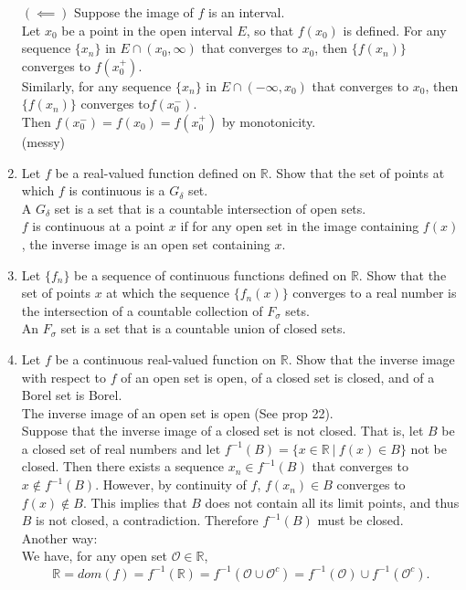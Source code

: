 \begin{enumerate}
	$(\impliedby)$ Suppose the image of $f$ is an interval.\\
	Let $x_0$ be a point in the open interval $E$, so that $f(x_0)$ is defined. 
	For any sequence $\{x_n\}$ in $E\cap(x_0,\infty)$ that converges to $x_0$, then $\{f(x_n)\}$ converges to $f(x_0^+)$.\\
	Similarly, for any sequence $\{x_n\}$ in $E\cap(-\infty,x_0)$ that converges to $x_0$, then $\{f(x_n)\}$ converges to$f(x_0^-)$.\\
	Then $f(x_0^-)=f(x_0)= f(x_0^+)$ by monotonicity.
	\\(messy)
	\item Let $f$ be a real-valued function defined on $\mathbb{R}$. Show that the set of points at which $f$ is continuous is a $G_\delta$ set.\\
	A $G_\delta$ set is a set that is a countable intersection of open sets.\\
	$f$ is continuous at a point $x$ if for any open set in the image containing $f(x)$, the inverse image is an open set containing $x$.
	\item Let $\{ f_n\}$ be a sequence of continuous functions defined on $\mathbb{R}$. Show that the set of points $x$ at which the sequence $\{f_n(x)\}$ converges to a real number is the intersection of a countable collection of $F_\sigma$ sets.\\
	An $F_\sigma$ set is a set that is a countable union of closed sets.
	\item Let $f$ be a continuous real-valued function on $\mathbb{R}$. Show that the inverse image with respect to $f$ of an open set is open, of a closed set is closed, and of a Borel set is Borel.\\
	The inverse image of an open set is open (See prop 22).\\
	Suppose that the inverse image of a closed set is not closed.
	That is, let $B$ be a closed set of real numbers and let $f^{-1}(B)=\{x\in\mathbb{R}\ |\ f(x)\in B\}$ not be closed. 
	Then there exists a sequence $x_n\in f^{-1}(B)$ that converges to $x \notin f^{-1}(B)$.
	However, by continuity of $f$, $f(x_n)\in B$ converges to $f(x)\notin B$.
	This implies that $B$ does not contain all its limit points, and thus $B$ is not closed, a contradiction.
	Therefore $f^{-1}(B)$ must be closed.\\
	Another way:\\
	We have, for any open set $\mathcal{O}\in\mathbb{R}$,
	\[
		\mathbb{R}=dom(f)=f^{-1}(\mathbb{R})=f^{-1}(\mathcal{O}\cup\mathcal{O}^c)=f^{-1}(\mathcal{O})\cup f^{-1}(\mathcal{O}^c).
\]
\end{enumerate}
